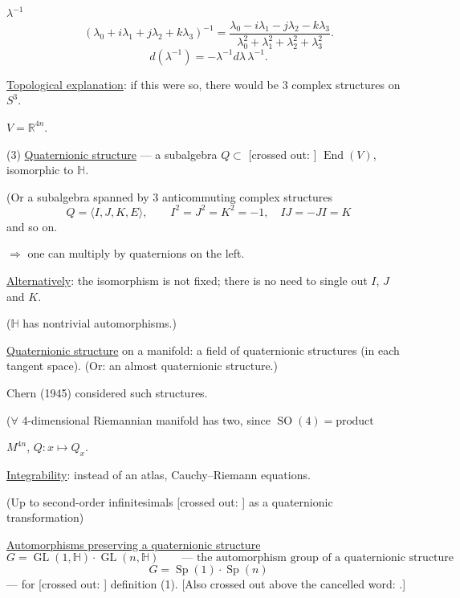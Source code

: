 $\lambda^{-1}$
\begin{equation*}
(\lambda_0+i\lambda_1+j\lambda_2+k\lambda_3)^{-1}
=\frac{\lambda_0-i\lambda_1-j\lambda_2-k\lambda_3}
{\lambda_0^2+\lambda_1^2+\lambda_2^2+\lambda_3^2}.
\end{equation*}
\begin{equation*}
d(\lambda^{-1})=-\lambda^{-1}d\lambda\,\lambda^{-1}.
\end{equation*}

\underline{Topological explanation}: if this were so, there would be 3 complex structures on $S^3$.

$V=\mathbb R^{4n}$.

(3) \underline{Quaternionic structure} --- a subalgebra $Q\subset$
[crossed out: ]
$\operatorname{End}(V)$, isomorphic to $\mathbb H$.

(Or a subalgebra spanned by 3 anticommuting complex structures
\begin{equation*}
Q=\langle I,J,K,E\rangle,\qquad
I^2=J^2=K^2=-1,\quad IJ=-JI=K
\end{equation*}
and so on.

$\Rightarrow$ one can multiply by quaternions on the left.

\underline{Alternatively}: the isomorphism is not fixed; there is no need to single out $I$, $J$ and $K$.

($\mathbb H$ has nontrivial automorphisms.)

\underline{Quaternionic structure} on a manifold: a field of quaternionic structures
(in each tangent space). (Or: an almost quaternionic structure.)

Chern (1945) considered such structures.

($\forall$ 4-dimensional Riemannian manifold has two, since
$\operatorname{SO}(4)=\text{product}$

$M^{4n}$, $Q:x\mapsto Q_x$.

\underline{Integrability}: instead of an atlas, Cauchy--Riemann equations.

(Up to second-order infinitesimals
[crossed out: ]
as a quaternionic transformation)

\underline{Automorphisms preserving a quaternionic structure}
\begin{equation*}
G=\operatorname{GL}(1,\mathbb H)\cdot\operatorname{GL}(n,\mathbb H)
\qquad\text{--- the automorphism group of a quaternionic structure}
\end{equation*}
\begin{equation*}
G=\operatorname{Sp}(1)\cdot\operatorname{Sp}(n)
\end{equation*}
--- for [crossed out:
]
definition (1).
[Also crossed out above the cancelled word:
.]

